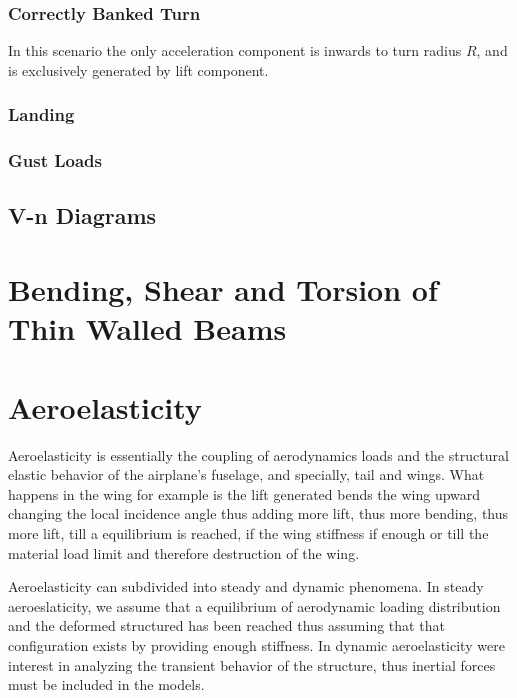 \subsubsection{Correctly Banked Turn}
In this scenario the only acceleration component is inwards to turn radius $R$, and is exclusively generated by lift component.


\subsubsection{Landing}

\subsubsection{Gust Loads}



\subsection{V-n Diagrams}




\newpage
\section{Bending, Shear and Torsion of Thin Walled Beams}







\newpage
\section{Aeroelasticity}
Aeroelasticity is essentially the coupling of aerodynamics loads and the structural elastic behavior of the airplane's fuselage, and specially, tail and wings. What happens in the wing for example is the lift generated bends the wing upward changing the local incidence angle thus adding more lift, thus more bending, thus more lift, till a equilibrium is reached, if the wing stiffness if enough or till the material load limit and therefore destruction of the wing.

Aeroelasticity can subdivided into steady and dynamic phenomena. In steady
aeroeslaticity, we assume that a equilibrium of aerodynamic loading distribution and the deformed structured has been reached thus assuming that that configuration exists by providing enough stiffness.  In dynamic aeroelasticity were interest in analyzing the transient behavior of the structure, thus inertial forces must be included in the models.

